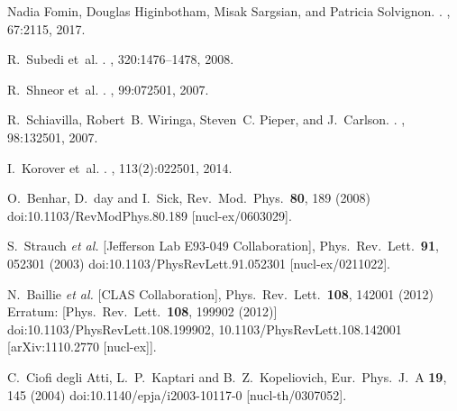 \documentclass[twocolumn]{revtex4}
\begin{document}
\begin{thebibliography}{25}
Nadia Fomin, Douglas Higinbotham, Misak Sargsian, and Patricia Solvignon.
.
, 67:2115, 2017.

R.~Subedi et~al.
.
, 320:1476--1478, 2008.

R.~Shneor et~al.
.
, 99:072501, 2007.

R.~Schiavilla, Robert~B. Wiringa, Steven~C. Pieper, and J.~Carlson.
.
, 98:132501, 2007.

I.~Korover et~al.
.
, 113(2):022501, 2014.


  O.~Benhar, D.~day and I.~Sick,
  Rev.\ Mod.\ Phys.\  {\bf 80}, 189 (2008)
  doi:10.1103/RevModPhys.80.189
  [nucl-ex/0603029].

  S.~Strauch {\it et al.} [Jefferson Lab E93-049 Collaboration],
  Phys.\ Rev.\ Lett.\  {\bf 91}, 052301 (2003)
  doi:10.1103/PhysRevLett.91.052301
  [nucl-ex/0211022].

  N.~Baillie {\it et al.} [CLAS Collaboration],
  Phys.\ Rev.\ Lett.\  {\bf 108}, 142001 (2012)
  Erratum: [Phys.\ Rev.\ Lett.\  {\bf 108}, 199902 (2012)]
  doi:10.1103/PhysRevLett.108.199902, 10.1103/PhysRevLett.108.142001
  [arXiv:1110.2770 [nucl-ex]].

  C.~Ciofi degli Atti, L.~P.~Kaptari and B.~Z.~Kopeliovich,
  Eur.\ Phys.\ J.\ A {\bf 19}, 145 (2004)
  doi:10.1140/epja/i2003-10117-0
  [nucl-th/0307052].


\end{thebibliography}
\end{document}
